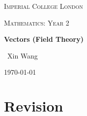 \documentclass[10pt,a4paper]{article}
\begin{document}

\begin{titlepage}
	\centering
	{\scshape\LARGE Imperial College London \par}
	\vspace{1cm}
    {\scshape\Large Mathematics: Year 2\par}
    \vspace{1.5cm}
	{\huge\bfseries Vectors (Field Theory)\par}
	\vspace{2cm}
	{\Large\ Xin Wang }
	\vfill
	{\large \today\par}
\end{titlepage}


\begin{abstract}
    In engineering, many applications uses functions of the space variable $\textbf{r}=x
    \textbf{i}+y \textbf{j} + z \textbf{k}$ as models for quantities in the 3-D space. Being able to
    manipulate and model quantities effectively is a critical skill in any engineering field.
\end{abstract}


\tableofcontents
\pagebreak

\section{Revision}
\end{document}
